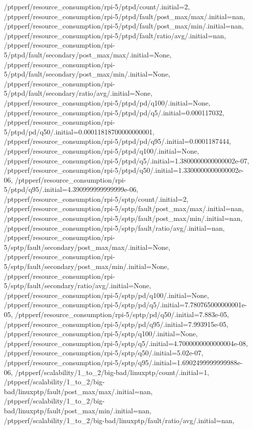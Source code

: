 {    /ptpperf/resource_consumption/rpi-5/ptpd/count/.initial=2,
    /ptpperf/resource_consumption/rpi-5/ptpd/fault/post_max/max/.initial=nan,
    /ptpperf/resource_consumption/rpi-5/ptpd/fault/post_max/min/.initial=nan,
    /ptpperf/resource_consumption/rpi-5/ptpd/fault/ratio/avg/.initial=nan,
    /ptpperf/resource_consumption/rpi-5/ptpd/fault/secondary/post_max/max/.initial=None,
    /ptpperf/resource_consumption/rpi-5/ptpd/fault/secondary/post_max/min/.initial=None,
    /ptpperf/resource_consumption/rpi-5/ptpd/fault/secondary/ratio/avg/.initial=None,
    /ptpperf/resource_consumption/rpi-5/ptpd/pd/q100/.initial=None,
    /ptpperf/resource_consumption/rpi-5/ptpd/pd/q5/.initial=0.000117032,
    /ptpperf/resource_consumption/rpi-5/ptpd/pd/q50/.initial=0.00011818700000000001,
    /ptpperf/resource_consumption/rpi-5/ptpd/pd/q95/.initial=0.0001187444,
    /ptpperf/resource_consumption/rpi-5/ptpd/q100/.initial=None,
    /ptpperf/resource_consumption/rpi-5/ptpd/q5/.initial=1.3800000000000002e-07,
    /ptpperf/resource_consumption/rpi-5/ptpd/q50/.initial=1.3300000000000002e-06,
    /ptpperf/resource_consumption/rpi-5/ptpd/q95/.initial=4.390999999999999e-06,
    /ptpperf/resource_consumption/rpi-5/sptp/count/.initial=2,
    /ptpperf/resource_consumption/rpi-5/sptp/fault/post_max/max/.initial=nan,
    /ptpperf/resource_consumption/rpi-5/sptp/fault/post_max/min/.initial=nan,
    /ptpperf/resource_consumption/rpi-5/sptp/fault/ratio/avg/.initial=nan,
    /ptpperf/resource_consumption/rpi-5/sptp/fault/secondary/post_max/max/.initial=None,
    /ptpperf/resource_consumption/rpi-5/sptp/fault/secondary/post_max/min/.initial=None,
    /ptpperf/resource_consumption/rpi-5/sptp/fault/secondary/ratio/avg/.initial=None,
    /ptpperf/resource_consumption/rpi-5/sptp/pd/q100/.initial=None,
    /ptpperf/resource_consumption/rpi-5/sptp/pd/q5/.initial=7.780765000000001e-05,
    /ptpperf/resource_consumption/rpi-5/sptp/pd/q50/.initial=7.883e-05,
    /ptpperf/resource_consumption/rpi-5/sptp/pd/q95/.initial=7.993915e-05,
    /ptpperf/resource_consumption/rpi-5/sptp/q100/.initial=None,
    /ptpperf/resource_consumption/rpi-5/sptp/q5/.initial=4.7000000000000004e-08,
    /ptpperf/resource_consumption/rpi-5/sptp/q50/.initial=5.02e-07,
    /ptpperf/resource_consumption/rpi-5/sptp/q95/.initial=1.6902499999999988e-06,
    /ptpperf/scalability/1_to_2/big-bad/linuxptp/count/.initial=1,
    /ptpperf/scalability/1_to_2/big-bad/linuxptp/fault/post_max/max/.initial=nan,
    /ptpperf/scalability/1_to_2/big-bad/linuxptp/fault/post_max/min/.initial=nan,
    /ptpperf/scalability/1_to_2/big-bad/linuxptp/fault/ratio/avg/.initial=nan,
}
